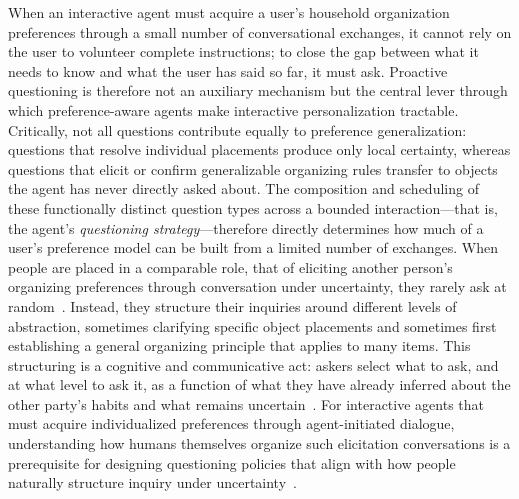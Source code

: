 \documentclass[manuscript,review,anonymous]{acmart}
\begin{document}
When an interactive agent must acquire a user's household organization preferences through a small number of conversational exchanges, it cannot rely on the user to volunteer complete instructions; to close the gap between what it needs to know and what the user has said so far, it must ask. Proactive questioning is therefore not an auxiliary mechanism but the central lever through which preference-aware agents make interactive personalization tractable. Critically, not all questions contribute equally to preference generalization: questions that resolve individual placements produce only local certainty, whereas questions that elicit or confirm generalizable organizing rules transfer to objects the agent has never directly asked about. The composition and scheduling of these functionally distinct question types across a bounded interaction---that is, the agent's \textit{questioning strategy}---therefore directly determines how much of a user's preference model can be built from a limited number of exchanges. When people are placed in a comparable role, that of eliciting another person's organizing preferences through conversation under uncertainty, they rarely ask at random~\cite{stivers2010overview,robinson2023probing}. Instead, they structure their inquiries around different levels of abstraction, sometimes clarifying specific object placements and sometimes first establishing a general organizing principle that applies to many items. This structuring is a cognitive and communicative act: askers select what to ask, and at what level to ask it, as a function of what they have already inferred about the other party's habits and what remains uncertain~\cite{zheng2019personalized,lawley2024val}. For interactive agents that must acquire individualized preferences through agent-initiated dialogue, understanding how humans themselves organize such elicitation conversations is a prerequisite for designing questioning policies that align with how people naturally structure inquiry under uncertainty~\cite{wu2023tidybot,cakmak2012designing,biyik2019asking,6padmakumar2022teach,8leusmann2025investigating}.
\end{document}
